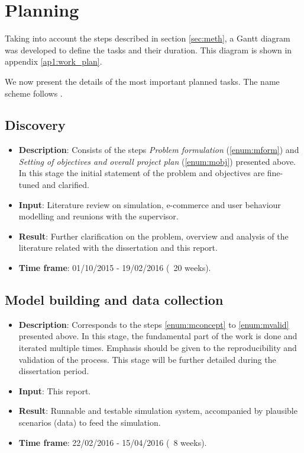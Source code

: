 \section{Planning}

Taking into account the steps described in section \ref{sec:meth}, a Gantt 
diagram was developed to define the tasks and their duration. This diagram is 
shown in appendix \ref{ap1:work_plan}.

We now present the details of the most important planned tasks. The name scheme 
follows \cite{Banks2004}.

\subsection{Discovery}

\begin{itemize}
    \item \textbf{Description}: Consists of the steps \textit{Problem 
    formulation} (\ref{enum:mform}) and \textit{Setting of objectives and 
    overall project plan} (\ref{enum:mobj}) presented above. In this stage the 
    initial statement of the problem and objectives are fine-tuned and 
    clarified.
    \item \textbf{Input}: Literature review on simulation, e-commerce and user 
    behaviour modelling and reunions with the supervisor.
    \item \textbf{Result}: Further clarification on the problem, overview and 
    analysis of the literature related with the dissertation and this report.
    \item \textbf{Time frame}: 01/10/2015 - 19/02/2016 (~20 weeks).
\end{itemize}

\subsection{Model building and data collection}

\begin{itemize}
    \item \textbf{Description}: Corresponds to the steps \ref{enum:mconcept} 
    to \ref{enum:mvalid} presented above. In this stage, the fundamental part 
    of the work is done and iterated multiple times. Emphasis should be given 
    to the reproducibility and validation of the process. This stage will be 
    further detailed during the dissertation period.
    \item \textbf{Input}: This report.
    \item \textbf{Result}: Runnable and testable simulation system, accompanied 
    by plausible scenarios (data) to feed the simulation.
    \item \textbf{Time frame}: 22/02/2016 - 15/04/2016 (~8 weeks).
\end{itemize}

